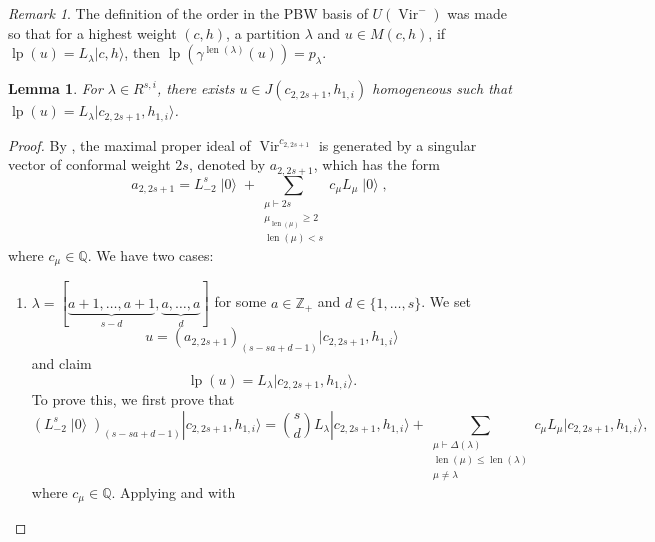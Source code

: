 \documentclass[a4paper, 12pt, reqno]{amsart}
\newtheorem{lemma}[theorem]{Lemma}
\theoremstyle{remark}
\newtheorem{remark}[theorem]{Remark}
\DeclareMathOperator{\Vir}{Vir}
\DeclareMathOperator{\len}{len}
\DeclareMathOperator{\vac}{|0\rangle}
\DeclareMathOperator{\lp}{lp}
\begin{document}
\begin{remark}
  \label{rmk:5}
  The definition of the order in the PBW basis of $U(\Vir^-)$ was made so that for a highest weight $(c, h)$, a partition $\lambda$ and $u \in M(c, h)$, if $\lp(u) = L_{\lambda}|c, h\rangle$, then $\lp(\gamma^{\len(\lambda)}(u)) = p_{\lambda}$.
\end{remark}

\begin{lemma}
  \label{lmm:11}
  For $\lambda \in R^{s, i}$, there exists $u \in J(c_{2, 2s + 1}, h_{1, i})$ homogeneous such that $\lp(u) = L_{\lambda}|c_{2, 2s + 1}, h_{1, i}\rangle$.
\end{lemma}

\begin{proof}
  By , the maximal proper ideal of $\Vir^{c_{2, 2s + 1}}$ is generated by a singular vector of conformal weight $2s$, denoted by $a_{2, 2s + 1}$, which has the form
  \begin{equation}
    \label{eq:7}
    a_{2, 2s + 1} = L_{-2}^s\vac + \sum_{\substack{\mu \vdash 2s \\ \mu_{\len(\mu)} \ge 2 \\ \len(\mu) < s}}c_{\mu}L_{\mu}\vac,
  \end{equation}
  where $c_{\mu} \in \mathbb{Q}$.
  We have two cases:
  \begin{enumerate}
  \item $\lambda = [\underbrace{a + 1, \dots, a + 1}_{s - d}, \underbrace{a, \dots, a}_d]$ for some $a \in \mathbb{Z}_+$ and $d \in \{1, \dots, s\}$.
    We set
    \begin{equation*}
      u = (a_{2, 2s + 1})_{(s - sa + d - 1)}|c_{2, 2s + 1}, h_{1, i}\rangle
    \end{equation*}
    and claim
    \begin{equation*}
      \lp(u) = L_{\lambda}|c_{2, 2s + 1}, h_{1, i}\rangle.
    \end{equation*}
    To prove this, we first prove that
    \begin{equation}
      \label{eq:8}
      (L_{-2}^s\vac)_{(s - sa + d - 1)}|c_{2, 2s + 1}, h_{1, i}\rangle = \binom{s}{d}L_{\lambda}|c_{2, 2s + 1}, h_{1, i}\rangle + \sum_{\substack{\mu \vdash \Delta(\lambda) \\ \len(\mu) \le \len(\lambda) \\ \mu \neq \lambda}}c_{\mu}L_{\mu}|c_{2, 2s + 1}, h_{1, i}\rangle,
    \end{equation}
    where $c_{\mu} \in \mathbb{Q}$.
    Applying  and  with

\end{enumerate}
\end{proof}
\end{document}

